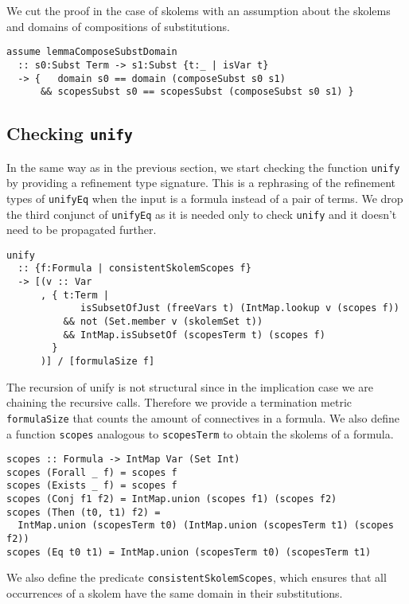 \documentclass[sigconf, anonymous, review]{acmart}
\newcommand{\tc}[1]{{\small\texttt{#1}}}
\begin{document}
We cut the proof in the case of skolems with an assumption about the
skolems and domains of compositions of substitutions.

\begin{verbatim}
assume lemmaComposeSubstDomain
  :: s0:Subst Term -> s1:Subst {t:_ | isVar t}
  -> {   domain s0 == domain (composeSubst s0 s1)
      && scopesSubst s0 == scopesSubst (composeSubst s0 s1) }
\end{verbatim}


\subsection{Checking \tc{unify}}

In the same way as in the previous section, we start checking the function \tc{unify}
by providing a refinement type signature. This is a rephrasing of the refinement
types of \tc{unifyEq} when the input is a formula instead of a pair of terms. We
drop the third conjunct of \tc{unifyEq} as it is needed only to check \tc{unify} and
it doesn't need to be propagated further.

\begin{verbatim}
unify
  :: {f:Formula | consistentSkolemScopes f}
  -> [(v :: Var
      , { t:Term |
             isSubsetOfJust (freeVars t) (IntMap.lookup v (scopes f))
          && not (Set.member v (skolemSet t))
          && IntMap.isSubsetOf (scopesTerm t) (scopes f)
        }
      )] / [formulaSize f]
\end{verbatim}

The recursion of unify is not structural since in the implication case we
are chaining the recursive calls. Therefore we provide a termination
metric \tc{formulaSize} that counts the amount of connectives in a formula.
We also define a function \tc{scopes} analogous to \tc{scopesTerm} to obtain the skolems
of a formula.

\begin{verbatim}
scopes :: Formula -> IntMap Var (Set Int)
scopes (Forall _ f) = scopes f
scopes (Exists _ f) = scopes f
scopes (Conj f1 f2) = IntMap.union (scopes f1) (scopes f2)
scopes (Then (t0, t1) f2) =
  IntMap.union (scopesTerm t0) (IntMap.union (scopesTerm t1) (scopes f2))
scopes (Eq t0 t1) = IntMap.union (scopesTerm t0) (scopesTerm t1)
\end{verbatim}

We also define the predicate \tc{consistentSkolemScopes}, which ensures that
all occurrences of a skolem have the same domain in their substitutions.
\end{document}
